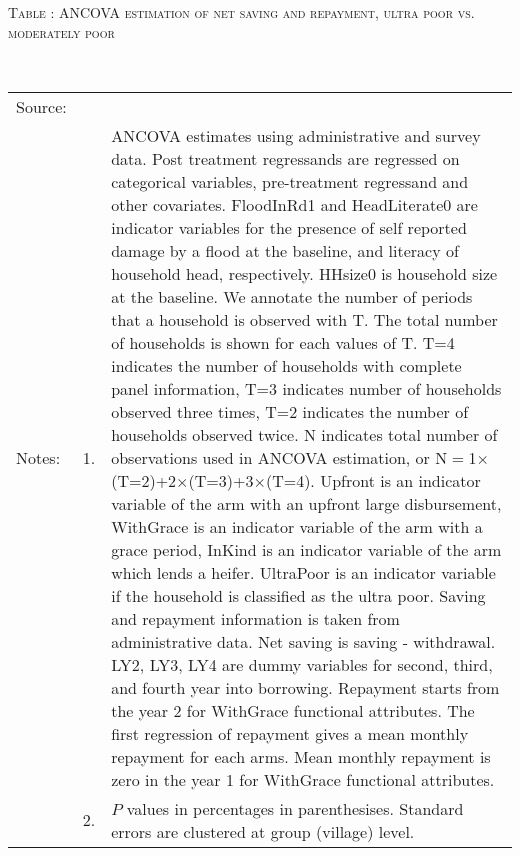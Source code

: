 \hspace{-1cm}\begin{minipage}[t]{14cm}
\hfil\textsc{\normalsize Table \thetable: ANCOVA estimation of net saving and repayment, ultra poor vs. moderately poor\label{tab ANCOVA Repayment time varying poverty}}\\
\setlength{\tabcolsep}{1pt}
\setlength{\baselineskip}{8pt}
\renewcommand{\arraystretch}{.55}
\hspace{-.75cm}\\
\renewcommand{\arraystretch}{.8}
\setlength{\tabcolsep}{1pt}
\begin{tabular}{>{\hfill\scriptsize}p{1cm}<{}>{\hfill\scriptsize}p{.25cm}<{}>{\scriptsize}p{12cm}<{\hfill}}
Source:& \multicolumn{2}{l}{\scriptsize Estimated with GUK administrative and survey data.}\\
Notes: & 1. & ANCOVA estimates using administrative and survey data. Post treatment regressands are regressed on categorical variables, pre-treatment regressand and other covariates. \textsf{FloodInRd1} and \textsf{HeadLiterate0} are indicator variables for the presence of self reported damage by a flood at the baseline, and literacy of household head, respectively. \textsf{HHsize0} is household size at the baseline. We annotate the number of periods that a household is observed with \textsf{T}. The total number of households is shown for each values of \textsf{T}. \textsf{T=4} indicates the number of households with complete panel information, \textsf{T=3} indicates number of households observed three times, \textsf{T=2} indicates the number of households observed twice. \textsf{N} indicates total number of observations used in ANCOVA estimation, or \textsf{N$=$1$\times$(T=2)+2$\times$(T=3)+3$\times$(T=4)}.  \textsf{Upfront} is an indicator variable of the arm with an upfront large disbursement, \textsf{WithGrace} is an indicator variable of the arm with a grace period, \textsf{InKind} is an indicator variable of the arm which lends a heifer. \textsf{UltraPoor} is an indicator variable if the household is classified as the ultra poor. Saving and repayment information is taken from administrative data. Net saving is saving - withdrawal. %
\textsf{LY2, LY3, LY4} are dummy variables for second, third, and fourth year into borrowing.  Repayment starts from the year 2 for \textsf{WithGrace} functional attributes. The first regression of repayment gives a mean monthly repayment for each arms. Mean monthly repayment is zero in the year 1 for \textsf{WithGrace} functional attributes.\\
& 2. & $P$ values in percentages in parenthesises. Standard errors are clustered at group (village) level.
\end{tabular}
\end{minipage}


